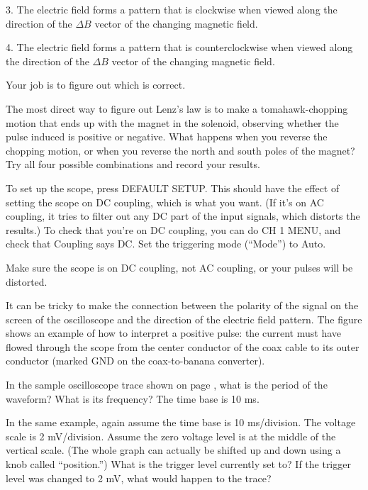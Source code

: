 3. The electric field forms a pattern that is clockwise when
viewed along the direction of the $\Delta B$ vector of the
changing magnetic field.

4. The electric field forms a pattern that is counterclockwise
when viewed along the direction of the $\Delta B$ vector of
the changing magnetic field.

Your job is to figure out which is correct.

The most direct way to figure out Lenz's law is to 
make a tomahawk-chopping motion that ends up with the magnet in the solenoid,
observing whether the pulse induced is positive or negative.
What happens when you reverse the
chopping motion, or when you reverse the north and south
poles of the magnet? Try all four possible combinations and
record your results.

To set up the scope, press DEFAULT SETUP. This should have the
effect of setting the scope on DC coupling, which is what you
want. (If it's on AC coupling, it tries to filter out any DC
part of the input signals, which distorts the results.) To check
that you're on DC coupling, you can do CH 1 MENU, and check that
Coupling says DC. Set the triggering mode (``Mode'') to Auto.

Make sure the scope is on DC coupling, not AC coupling, or your
pulses will be distorted.


It can be tricky to make the connection between the polarity
of the signal on the screen of the oscilloscope and the
direction of the electric field pattern. The figure shows an
example of how to interpret a positive pulse: the current
must have flowed through the scope from the center conductor
of the coax cable to its outer conductor (marked GND on the
coax-to-banana converter). 

\prelab

\prelabquestion  In the sample oscilloscope trace shown on
page \pageref{fig:em-osc-waveform}, what is
the period of the waveform? What is its frequency? The time base is
10 ms.

\prelabquestion  In the same example, again assume the time base is 10
ms/division. The voltage scale is 2 mV/div\-ision. Assume
the zero voltage level is at the middle of the vertical
scale. (The whole graph can actually be shifted up and down
using a knob called ``position.'')  What is the trigger
level currently set to? If the trigger level was changed to
2 mV, what would happen to the trace?

